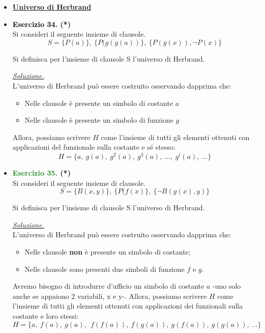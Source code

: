 \documentclass[a4paper,10pt]{article}
\begin{document}
{\begin{itemize}[label=, leftmargin=0pt]
    \item \textbf{\underline{Universo di Herbrand}}

    \item \textbf{\textcolor{black}{Esercizio 34.} (*)} \\ 	
    Si consideri il seguente insieme di clausole.
    $$ S = \{P(a)\},\ \{P(g(g(a))\},\ \{P(g(x)),\lnot P(x)\} $$
    
    Si definisca per l'insieme di clausole S l'universo di Herbrand.
    
    \begin{osservazioni}
    \underline{\textit{Soluzione.}}\\
    L'universo di Herbrand può essere costruito osservando dapprima che:
    \begin{itemize}
        \item Nelle clausole è presente un simbolo di costante $a$
        \item Nelle clausole è presente un simbolo di funzione $g$
    \end{itemize}
    Allora, possiamo scrivere $H$ come l'insieme di tutti gli elementi ottenuti con applicazioni del funzionale sulla costante e sé stesso:
    $$H=\{a,\ g(a),\ g^2(a),\ g^3(a),\ ...,\ g^i(a),\ ...\}$$
    \end{osservazioni}

    \item \textbf{\textcolor{ForestGreen}{Esercizio 35.} (*)} \\ 	
    Si consideri il seguente insieme di clausole.
    $$ S = \{B(x,y)\},\ \{P(f(x)\},\ \{\lnot B(g(x),y)\} $$
    
    Si definisca per l'insieme di clausole S l'universo di Herbrand.
    \begin{osservazioni}
    \underline{\textit{Soluzione.}}\\
    L'universo di Herbrand può essere costruito osservando dapprima che:
    \begin{itemize}
        \item Nelle clausole \textbf{non} è presente un simbolo di costante;
        \item Nelle clausole sono presenti due simboli di funzione $f$ e $g$.
    \end{itemize}
    Avremo bisogno di introdurre d'ufficio un simbolo di costante $a$ -uno solo anche se appaiono 2 variabili, x e y-. 
    Allora, possiamo scrivere $H$ come l'insieme di tutti gli elementi ottenuti con applicazioni dei funzionali sulla costante e loro stessi:
    $$H=\{a,\ f(a),\ g(a),\ \ f(f(a)),\ f(g(a)),\ g(f(a)),\ g(g(a)),\ ...\}$$
    \end{osservazioni}
    

\end{itemize}}
\end{document}
